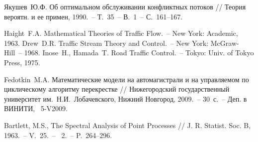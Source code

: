 \documentclass[a4paper,12pt,russian]{extarticle}
\newcommand{\No}{\textnumero}
\begin{document}
\begin{thebibliography}{99}
 Якушев~Ю.Ф. Об оптимальном обслуживании конфликтных потоков //  Теория вероятн. и ее примен, 1990.~-- Т.~35~-- В.~1~-- С.~161–167.

 Haight~F.A. Mathematical Theories of Traffic Flow.~-- New York: Academic, 1963. 
 Drew~D.R. Traffic Stream Theory and Control.~-- New York: McGraw-Hill~-- 1968.
 Inose~H., Hamada~T. Road Traffic Control.~-- Tokyo: Univ. of Tokyo Press, 1975.

 Fedotkin~M.A. Математические модели на автомагистрали и на управляемом по циклическому алгоритму перекрестке // Нижегородский государственный университет им.~Н.И.~Лобачевского, Нижний Новгород, 2009.~-- 30~с.~-- Деп. в ВИНИТИ, \No{}~5-V2009.

 Bartlett, M.S., The Spectral Analysis of Point Processes // J. R. Statist. Soc. B, 1963.~-- V.~25.~-- \No{}~2.~-- P.~264–296.



\end{thebibliography}
\end{document}
